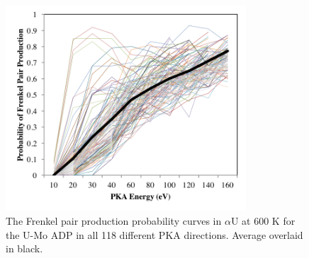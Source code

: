 \documentclass[review]{elsarticle}
\begin{document}
\begin{figure}[h]
 \centering
 \includegraphics[width=0.8\textwidth]{ed_dir_allE_alpha.png} 
 \caption{The Frenkel pair production probability curves in $\alpha$U at 600 K for the U-Mo ADP in all 118 different PKA directions. Average overlaid in black.}
 \label{fig:ed_diralpha}
\end{figure}

\FloatBarrier
\end{document}
